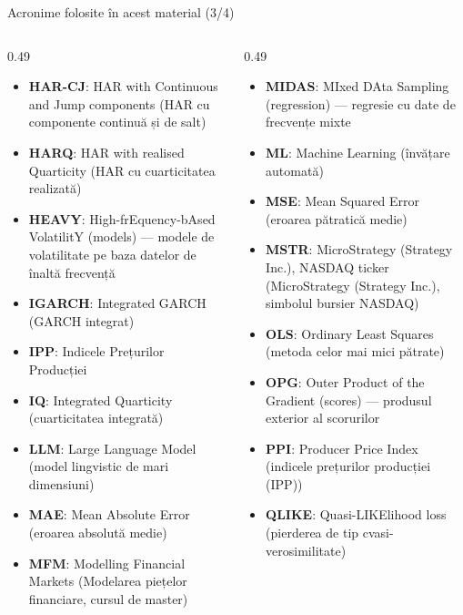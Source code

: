 \begin{frame}{Acronime folosite în acest material (3/4)}
\begin{columns}[T]
\begin{column}{0.49\textwidth}
\begin{itemize}\setlength{\itemsep}{0pt}
    \item \textbf{HAR-CJ}: HAR with Continuous and Jump components (HAR cu componente continuă și de salt)
    \item \textbf{HARQ}: HAR with realised Quarticity (HAR cu cuarticitatea realizată)
    \item \textbf{HEAVY}: High-frEquency-bAsed VolatilitY (models) — modele de volatilitate pe baza datelor de înaltă frecvență
    \item \textbf{IGARCH}: Integrated GARCH (GARCH integrat)
    \item \textbf{IPP}: Indicele Prețurilor Producției
    \item \textbf{IQ}: Integrated Quarticity (cuarticitatea integrată)
    \item \textbf{LLM}: Large Language Model (model lingvistic de mari dimensiuni)
    \item \textbf{MAE}: Mean Absolute Error (eroarea absolută medie)
    \item \textbf{MFM}: Modelling Financial Markets (Modelarea piețelor financiare, cursul de master)
\end{itemize}
\end{column}
\begin{column}{0.49\textwidth}
\begin{itemize}\setlength{\itemsep}{0pt}
    \item \textbf{MIDAS}: MIxed DAta Sampling (regression) — regresie cu date de frecvențe mixte
    \item \textbf{ML}: Machine Learning (învățare automată)
    \item \textbf{MSE}: Mean Squared Error (eroarea pătratică medie)
    \item \textbf{MSTR}: MicroStrategy (Strategy Inc.), NASDAQ ticker (MicroStrategy (Strategy Inc.), simbolul bursier NASDAQ)
    \item \textbf{OLS}: Ordinary Least Squares (metoda celor mai mici pătrate)
    \item \textbf{OPG}: Outer Product of the Gradient (scores) — produsul exterior al scorurilor
    \item \textbf{PPI}: Producer Price Index (indicele prețurilor producției (IPP))
    \item \textbf{QLIKE}: Quasi-LIKElihood loss (pierderea de tip cvasi-verosimilitate)
\end{itemize}
\end{column}
\end{columns}
\end{frame}
